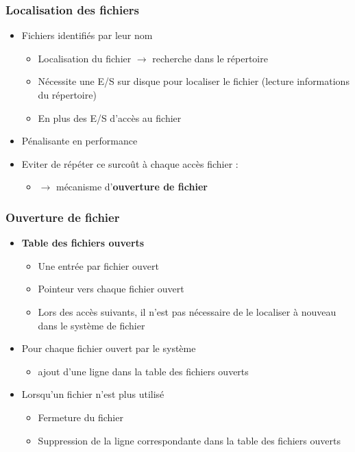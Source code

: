 \begin{frame}
\frametitle{Localisation des fichiers}
\begin{itemize}
\item Fichiers identifiés par leur nom
\begin{itemize}
\item Localisation du fichier $\rightarrow$ recherche dans le répertoire
\item Nécessite une E/S sur disque pour localiser le fichier (lecture informations du répertoire)
\item En plus des E/S d'accès au fichier
\end{itemize}
\item Pénalisante en performance
\item Eviter de répéter ce surcoût à chaque accès fichier :
\begin{itemize}
  \item $\rightarrow$ mécanisme d'\textbf{ouverture de fichier}
\end{itemize}
\end{itemize}
\end{frame}

\begin{frame}
\frametitle{Ouverture de fichier}
\begin{itemize}
\item \textbf{Table des fichiers ouverts}
\begin{itemize}
\item Une entrée par fichier ouvert
\item Pointeur vers chaque fichier ouvert
\item Lors des accès suivants, il n'est pas nécessaire de le localiser à nouveau dans le système de fichier
\end{itemize}
\item Pour chaque fichier ouvert par le système
\begin{itemize}
  \item ajout d'une ligne dans la table des fichiers ouverts
\end{itemize}
\item Lorsqu'un fichier n'est plus utilisé
\begin{itemize}
  \item Fermeture du fichier
  \item Suppression de la ligne correspondante dans la table des fichiers ouverts
\end{itemize}
\end{itemize}
\end{frame}


